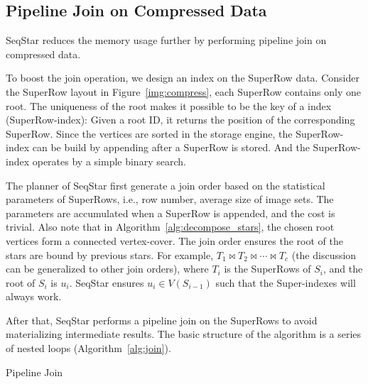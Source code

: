 \subsection{Pipeline Join on Compressed Data}\label{sec:match_join}
SeqStar reduces the memory usage further by performing pipeline join on compressed data.

To boost the join operation, we design an index on the SuperRow data.
Consider the SuperRow layout in Figure~\ref{img:compress}, each SuperRow contains only one root.
The uniqueness of the root makes it possible to be the key of a index (SuperRow-index):
Given a root ID, it returns the position of the corresponding SuperRow.
Since the vertices are sorted in the storage engine,
the SuperRow-index can be build by appending after a SuperRow is stored.
And the SuperRow-index operates by a simple binary search.

The planner of SeqStar first generate a join order based on the statistical parameters of SuperRows,
i.e., row number, average size of image sets.
The parameters are accumulated when a SuperRow is appended, and the cost is trivial.
Also note that in Algorithm~\ref{alg:decompose_stars}, the chosen root vertices form a connected vertex-cover.
The join order ensures the root of the stars are bound by previous stars.
For example, $T_1 \Join T_2 \Join \cdots \Join T_c$ (the discussion can be generalized to other join orders),
where $T_i$ is the SuperRows of $S_i$, and the root of $S_i$ is $u_i$.
SeqStar ensures $u_i \in V(S_{i-1})$ such that the Super-indexes will always work.

After that, SeqStar performs a pipeline join on the SuperRows to avoid materializing intermediate results.
The basic structure of the algorithm is a series of nested loops  (Algorithm~\ref{alg:join}).

\begin{algorithm}[ht]
  \caption{Pipeline Join}\label{alg:join}
\end{algorithm}

